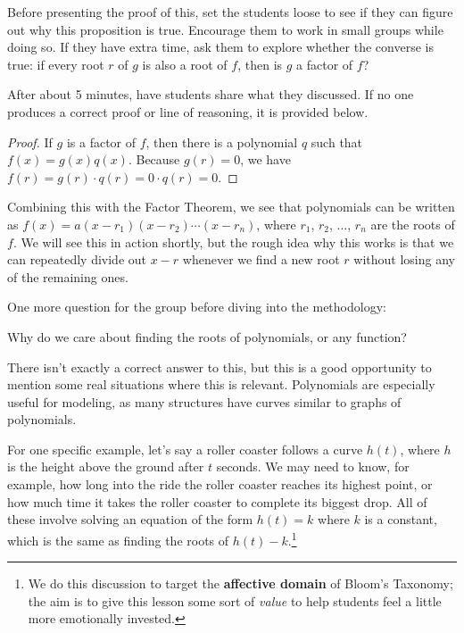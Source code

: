 Before presenting the proof of this, set the students loose to see if they can figure out why this proposition is true. Encourage them to work in small groups while doing so. If they have extra time, ask them to explore whether the converse is true: if every root $r$ of $g$ is also a root of $f$, then is $g$ a factor of $f$?

After about 5 minutes, have students share what they discussed. If no one produces a correct proof or line of reasoning, it is provided below.

\begin{proof}
    If $g$ is a factor of $f$, then there is a polynomial $q$ such that $f(x) = g(x) q(x)$. Because $g(r)= 0$, we have $f(r) = g(r)\cdot q(r) = 0\cdot q(r) = 0$.
\end{proof}

Combining this with the Factor Theorem, we see that polynomials can be written as $f(x) = a(x-r_1)(x-r_2)\cdots (x-r_n)$, where $r_1$, $r_2$, $\dots$, $r_n$ are the roots of $f$. We will see this in action shortly, but the rough idea why this works is that we can repeatedly divide out $x-r$ whenever we find a new root $r$ without losing any of the remaining ones.

One more question for the group before diving into the methodology:

\begin{ques}
    Why do we care about finding the roots of polynomials, or any function?
\end{ques}

There isn't exactly a correct answer to this, but this is a good opportunity to mention some real situations where this is relevant. Polynomials are especially useful for modeling, as many structures have curves similar to graphs of polynomials. 

For one specific example, let's say a roller coaster follows a curve $h(t)$, where $h$ is the height above the ground after $t$ seconds. We may need to know, for example, how long into the ride the roller coaster reaches its highest point, or how much time it takes the roller coaster to complete its biggest drop. All of these involve solving an equation of the form $h(t) = k$ where $k$ is a constant, which is the same as finding the roots of $h(t)-k$.\footnote{We do this discussion to target the \textbf{affective domain} of Bloom's Taxonomy; the aim is to give this lesson some sort of \emph{value} to help students feel a little more emotionally invested.}



